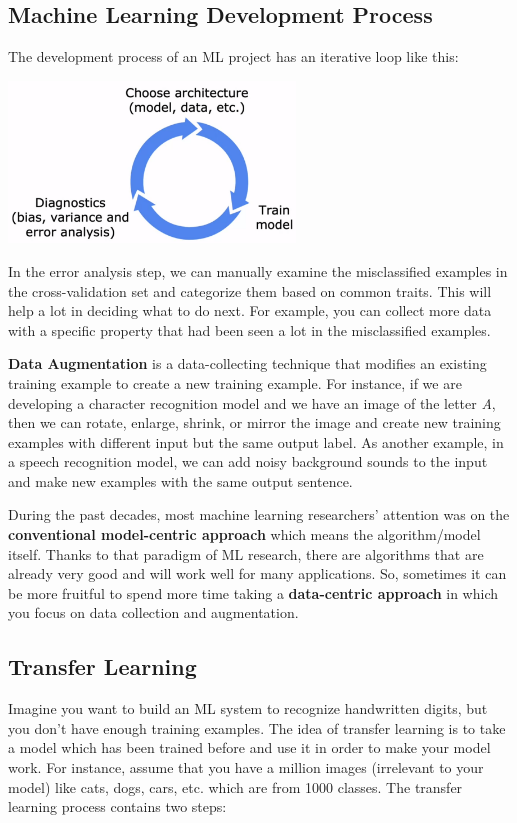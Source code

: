 \documentclass[a4paper, 12pt]{book}
\begin{document}
\subsection{Machine Learning Development Process}
The development process of an ML project has an iterative loop like this:
\begin{center}
    \includegraphics[width=3in]{graphics/ML_dev_loop.png}
\end{center}
In the error analysis step, we can manually examine the misclassified examples in the cross-validation set and categorize them based on common traits. This will help a lot in deciding what to do next. For example, you can collect more data with a specific property that had been seen a lot in the misclassified examples.

\textbf{Data Augmentation} is a data-collecting technique that modifies an existing training example to create a new training example. For instance, if we are developing a character recognition model and we have an image of the letter \emph{A}, then we can rotate, enlarge, shrink, or mirror the image and create new training examples with different input but the same output label. As another example, in a speech recognition model, we can add noisy background sounds to the input and make new examples with the same output sentence.

During the past decades, most machine learning researchers' attention was on the \textbf{conventional model-centric approach} which means the algorithm/model itself. Thanks to that paradigm of ML research, there are algorithms that are already very good and will work well for many applications. So, sometimes it can be more fruitful to spend more time taking a \textbf{data-centric approach} in which you focus on data collection and augmentation.

\subsection{Transfer Learning}
Imagine you want to build an ML system to recognize handwritten digits, but you don't have enough training examples. The idea of transfer learning is to take a model which has been trained before and use it in order to make your model work. For instance, assume that you have a million images (irrelevant to your model) like cats, dogs, cars, etc. which are from 1000 classes. The transfer learning process contains two steps:
\end{document}
